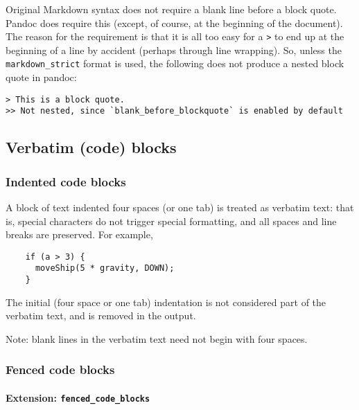 \documentclass[
  a4paper,
]{article}
\begin{document}
Original Markdown syntax does not require a blank line before a block
quote. Pandoc does require this (except, of course, at the beginning of
the document). The reason for the requirement is that it is all too easy
for a \texttt{\textgreater{}} to end up at the beginning of a line by
accident (perhaps through line wrapping). So, unless the
\texttt{markdown\_strict} format is used, the following does not produce
a nested block quote in pandoc:

\begin{verbatim}
> This is a block quote.
>> Not nested, since `blank_before_blockquote` is enabled by default
\end{verbatim}

\hypertarget{verbatim-code-blocks}{%
\subsection{Verbatim (code) blocks}\label{verbatim-code-blocks}}

\hypertarget{indented-code-blocks}{%
\subsubsection{Indented code blocks}\label{indented-code-blocks}}

A block of text indented four spaces (or one tab) is treated as verbatim
text: that is, special characters do not trigger special formatting, and
all spaces and line breaks are preserved. For example,

\begin{verbatim}
    if (a > 3) {
      moveShip(5 * gravity, DOWN);
    }
\end{verbatim}

The initial (four space or one tab) indentation is not considered part
of the verbatim text, and is removed in the output.

Note: blank lines in the verbatim text need not begin with four spaces.

\hypertarget{fenced-code-blocks}{%
\subsubsection{Fenced code blocks}\label{fenced-code-blocks}}

\hypertarget{extension-fenced_code_blocks}{%
\paragraph{\texorpdfstring{Extension:
\texttt{fenced\_code\_blocks}}{Extension: fenced\_code\_blocks}}\label{extension-fenced_code_blocks}}
\end{document}
